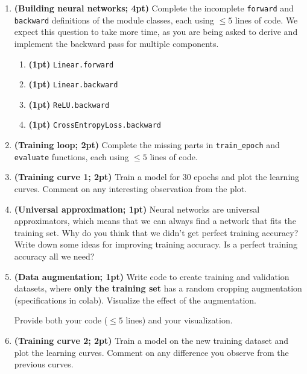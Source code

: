 \documentclass[12pt,letterpaper]{article}
\begin{document}
\begin{enumerate}[resume]
    \item \textbf{(Building neural networks; 4pt)} Complete the incomplete \texttt{forward} and \texttt{backward} definitions of the module classes, each using $\leq 5$ lines of code. We expect this question to take more time, as you are being asked to derive and implement the backward pass for multiple components.
    
    \begin{enumerate}
        \item \textbf{(1pt)} \texttt{Linear.forward}
        \item \textbf{(1pt)} \texttt{Linear.backward}
        \item \textbf{(1pt)} \texttt{ReLU.backward}
        \item \textbf{(1pt)} \texttt{CrossEntropyLoss.backward}
    \end{enumerate}

    \item \textbf{(Training loop; 2pt)} Complete the missing parts in \texttt{train\_epoch} and \texttt{evaluate} functions, each using $\leq 5$ lines of code.
    
    \item \textbf{(Training curve 1; 2pt)} Train a model for $30$ epochs and plot the learning curves. Comment on any interesting observation from the plot.
    
    \item \textbf{(Universal approximation; 1pt)} Neural networks are universal approximators, which means that we can always find a network that fits the training set. Why do you think that we didn't get perfect training accuracy? Write down some ideas for improving training accuracy. Is a perfect training accuracy all we need?
    
    \item \textbf{(Data augmentation; 1pt)} Write code to create training and validation datasets, where \textbf{only the training set} has a random cropping augmentation (specifications in colab). Visualize the effect of the augmentation.
    
    Provide both your code ($\leq 5$ lines) and your visualization.

    \item \textbf{(Training curve 2; 2pt)} Train a model on the new training dataset and plot the learning curves. Comment on any difference you observe from the previous curves. 

\end{enumerate}



\end{document}

